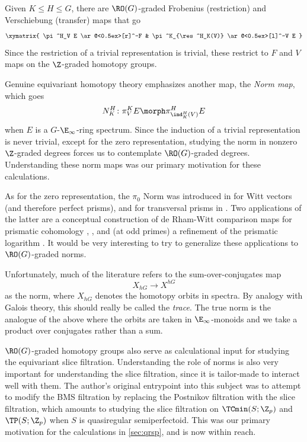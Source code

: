 \begin{motivation}
  Given $K\le H\le G$, there are $\RO(G)$-graded Frobenius (restriction) and Verschiebung (transfer) maps that go
    \[\xymatrix{
        \pi^H_V E \ar@<0.5ex>[r]^-F & \pi^K_{\res^H_K(V)} \ar@<0.5ex>[l]^-V E
    }\]
    Since the restriction of a trivial representation is trivial, these restrict to $F$ and $V$ maps on the $\Z$-graded homotopy groups.

    Genuine equivariant homotopy theory emphasizes another map, the \emph{Norm{} map}, which goes
    \[ N^H_K\colon \pi^K_V E \morph \pi^H_{\ind^H_K(V)} E \]
    when $E$ is a $G$-$\E_\infty$-ring spectrum. Since the induction of a trivial representation is never trivial, except for the zero representation, studying the norm in nonzero $\Z$-graded degrees forces us to contemplate $\RO(G)$-graded degrees. Understanding these norm maps was our primary motivation for these calculations.

  As for the zero representation, the $\pi_0$ Norm was introduced in \cite{AngeltveitNorm} for Witt vectors (and therefore perfect prisms), and for transversal prisms in \cite{PrismsTambara1}. Two applications of the latter are a conceptual construction of de Rham-Witt comparison maps for prismatic cohomology \cite{Molokov}, \cite[]{PrismsTambara1}, and (at odd primes) a refinement of the prismatic logarithm \cite{MaoLogarithm}. It would be very interesting to try to generalize these applications to $\RO(G)$-graded norms.
\end{motivation}

\begin{warning}
  Unfortunately, much of the literature refers to the sum-over-conjugates map
  \[ X_{hG} \to X^{hG} \]
  as the norm, where $X_{hG}$ denotes the homotopy orbits in spectra. By analogy with Galois theory, this should really be called the \emph{trace}. The true norm is the analogue of the above where the orbits are taken in $\E_\infty$-monoids and we take a product over conjugates rather than a sum.
\end{warning}

\begin{motivation}
  $\RO(G)$-graded homotopy groups also serve as calculational input for studying the equivariant slice filtration. Understanding the role of norms is also very important for understanding the slice filtration, since it is tailor-made to interact well with them. The author's original entrypoint into this subject was to attempt to modify the BMS filtration by replacing the Postnikov filtration with the slice filtration, which amounts to studying the slice filtration on $\TCmin(S;\Z_p)$ and $\TP(S;\Z_p)$ when $S$ is quasiregular semiperfectoid. This was our primary motivation for the calculations in \sec\ref{sec:qrsp}, and is now within reach.
\end{motivation}

